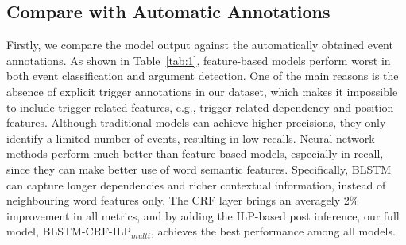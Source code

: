 \subsection{Compare with Automatic Annotations}
Firstly, we compare the model output against the automatically obtained event annotations.
As shown in Table~\ref{tab:1}, feature-based models perform worst in both event classification and argument detection.
One of the main reasons is the absence of explicit trigger annotations in our dataset, which makes it impossible to include trigger-related features, e.g., trigger-related dependency and position features.
Although traditional models can achieve higher precisions, they only identify a limited number of events, resulting in low recalls.
Neural-network methods perform much better than feature-based models, especially in recall, since they can make better use of word semantic features. Specifically, BLSTM can capture longer dependencies and richer contextual information, instead of neighbouring word features only.
The CRF layer brings an averagely 2\% improvement in all metrics, and by adding the ILP-based post inference, our full model, BLSTM-CRF-ILP$_{multi}$, achieves the best performance among all models.

